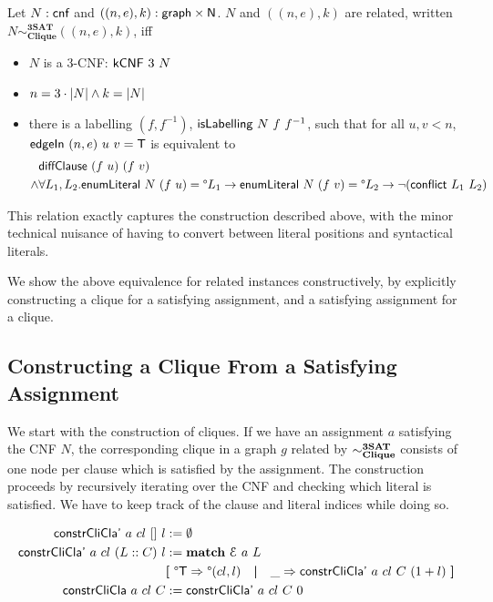\documentclass[a4paper,UKenglish,cleveref, autoref]{lipics-v2019}
\newcommand{\TODO}[1]{}
\begin{document}
\begin{definition}
  Let $N : \textsf{cnf}$ and $((n, e), k) : \textsf{graph} \times \mathsf{N}$. $N$ and $((n, e), k)$ are related, written $N \sim^{\textbf{3SAT}}_{\textbf{Clique}} ((n, e), k)$, iff 
  \begin{itemize} 
    \item $N$ is a 3-CNF: $\normalfont\textsf{kCNF}~3~N$
    \item $n = 3 \cdot |N| \land k = |N|$
    \item there is a labelling $(f, f^{-1})$, $\normalfont\textsf{isLabelling}~N~f~f^{-1}$, such that for all $u, v < n$, $\normalfont\textsf{edgeIn}~(n, e)~u~v = \mathsf{T}$ is equivalent to
      \begin{align*}
        &\normalfont\textsf{diffClause}~(f~u)~(f~v) \\
      \land& \forall L_1,L_2. \normalfont{\textsf{enumLiteral}}~N~(f~u) = \degree L_1 \rightarrow \normalfont{\textsf{enumLiteral}}~N~(f~v) = \degree L_2 \rightarrow \lnot (\normalfont\textsf{conflict}~L_1~L_2) 
    \end{align*}
  \end{itemize}
\end{definition}

This relation exactly captures the construction described above, with the minor technical nuisance of having to convert between literal positions and syntactical literals.
\TODO{ maybe add well-formedness explicitly}

We show the above equivalence for related instances constructively, by explicitly constructing a clique for a satisfying assignment, and a satisfying assignment for a clique. 

\subsection{Constructing a Clique From a Satisfying Assignment}
We start with the construction of cliques. If we have an assignment $a$ satisfying the CNF $N$, the corresponding clique in a graph $g$ related by $\sim^{\textbf{3SAT}}_{\textbf{Clique}}$ consists of one node per clause which is satisfied by the assignment. The construction proceeds by recursively iterating over the CNF and checking which literal is satisfied. We have to keep track of the clause and literal indices while doing so.

\begin{align*}
  \textsf{constrCliCla'}~a~cl~[]~l &:= \emptyset \\
  \textsf{constrCliCla'}~a~cl~(L::C)~l &:= \textbf{match}~ \mathcal{E}~a~L~ \\
  &\textbf{[}~ \degree\mathsf{T} \Rightarrow \degree(cl, l) \quad\textbf{|}\quad \_ \Rightarrow \textsf{constrCliCla'}~a~cl~C~(1 +{l}) ~\textbf{]}\\
  \textsf{constrCliCla}~a~cl~C &:= \textsf{constrCliCla'}~a~cl~C~0
\end{align*}
\end{document}
